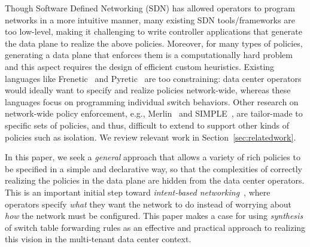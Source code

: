 Though Software Defined Networking (SDN) has allowed operators
to program networks in a more intuitive manner, many existing SDN
tools/frameworks are too low-level, making it challenging
to write controller applications that generate the
data plane to realize the above policies. %
Moreover, for many types of
  policies, generating a data plane 
  that enforces them is a
computationally hard problem and
this aspect requires the design of efficient custom heuristics.
Existing
languages like Frenetic~\cite{frenetic} and Pyretic~\cite{pyretic} are
too constraining: data center operators would ideally want to specify
and realize policies network-wide, whereas these languages focus on
programming individual switch behaviors. %
Other research on network-wide policy enforcement, e.g.,
Merlin~\cite{merlin} and SIMPLE~\cite{simple}, are tailor-made to
specific sets of policies, and thus, difficult to extend to support
other kinds of policies such as isolation. We review relevant work in
Section~\ref{sec:relatedwork}.


In this paper, we seek a {\em general} approach that allows a variety
of rich policies to be specified in a simple and declarative way, so
that the complexities of correctly realizing the policies in the data
plane are hidden from the data center operators. This is an important
initial step toward {\em intent-based networking}~\cite{intent}, where
operators specify {\em what} they want the network to do instead of
worrying about {\em how} the network must be configured.
This paper makes a case for using \emph{synthesis} of switch table
forwarding rules as an effective and practical approach to realizing
this vision in the multi-tenant data center context.

